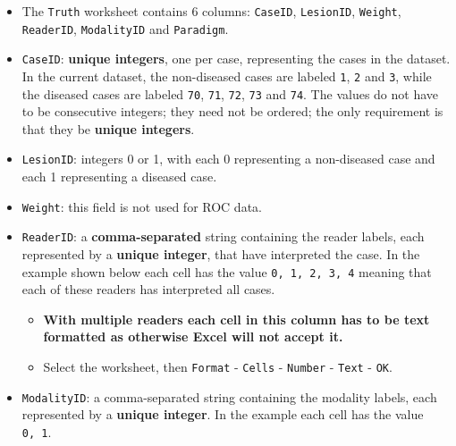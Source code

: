 \documentclass[
]{book}
\providecommand{\tightlist}{%
  \setlength{\itemsep}{0pt}\setlength{\parskip}{0pt}}
\begin{document}
\begin{itemize}
\tightlist
\item
  The \texttt{Truth} worksheet contains 6 columns: \texttt{CaseID}, \texttt{LesionID}, \texttt{Weight}, \texttt{ReaderID}, \texttt{ModalityID} and \texttt{Paradigm}.
\item
  \texttt{CaseID}: \textbf{unique integers}, one per case, representing the cases in the dataset. In the current dataset, the non-diseased cases are labeled \texttt{1}, \texttt{2} and \texttt{3}, while the diseased cases are labeled \texttt{70}, \texttt{71}, \texttt{72}, \texttt{73} and \texttt{74}. The values do not have to be consecutive integers; they need not be ordered; the only requirement is that they be \textbf{unique integers}.
\item
  \texttt{LesionID}: integers 0 or 1, with each 0 representing a non-diseased case and each 1 representing a diseased case.
\item
  \texttt{Weight}: this field is not used for ROC data.
\item
  \texttt{ReaderID}: a \textbf{comma-separated} string containing the reader labels, each represented by a \textbf{unique integer}, that have interpreted the case. In the example shown below each cell has the value \texttt{0,\ 1,\ 2,\ 3,\ 4} meaning that each of these readers has interpreted all cases.

  \begin{itemize}
  \tightlist
  \item
    \textbf{With multiple readers each cell in this column has to be text formatted as otherwise Excel will not accept it.}
  \item
    Select the worksheet, then \texttt{Format} - \texttt{Cells} - \texttt{Number} - \texttt{Text} - \texttt{OK}.
  \end{itemize}
\item
  \texttt{ModalityID}: a comma-separated string containing the modality labels, each represented by a \textbf{unique integer}. In the example each cell has the value \texttt{0,\ 1}.


\end{itemize}
\end{document}
